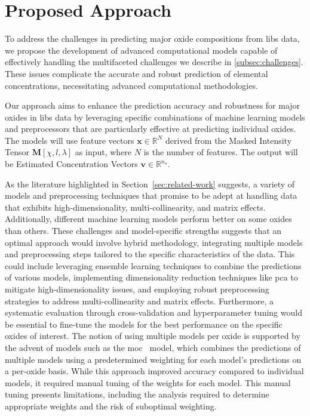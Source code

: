 \section{Proposed Approach}
To address the challenges in predicting major oxide compositions from \gls{libs} data, we propose the development of advanced computational models capable of effectively handling the multifaceted challenges we describe in \ref{subsec:challenges}.
These issues complicate the accurate and robust prediction of elemental concentrations, necessitating advanced computational methodologies. 

Our approach aims to enhance the prediction accuracy and robustness for major oxides in \gls{libs} data by leveraging specific combinations of machine learning models and preprocessors that are particularly effective at predicting individual oxides.
The models will use feature vectors $\mathbf{x} \in \mathbb{R}^N$ derived from the Masked Intensity Tensor $\mathbf{M}[\chi, l, \lambda]$ as input, where $N$ is the number of features. 
The output will be Estimated Concentration Vectors $\mathbf{v} \in \mathbb{R}^{n_o}$.

As the literature highlighted in Section~\ref{sec:related-work} suggests, a variety of models and preprocessing techniques that promise to be adept at handling data that exhibits high-dimensionality, multi-collinearity, and matrix effects.
Additionally, different machine learning models perform better on some oxides than others. 
These challenges and model-specific strengths suggests that an optimal approach would involve hybrid methodology, integrating multiple models and preprocessing steps tailored to the specific characteristics of the data.
This could include leveraging ensemble learning techniques to combine the predictions of various models, implementing dimensionality reduction techniques like \gls{pca} to mitigate high-dimensionality issues, and employing robust preprocessing strategies to address multi-collinearity and matrix effects.
Furthermore, a systematic evaluation through cross-validation and hyperparameter tuning would be essential to fine-tune the models for the best performance on the specific oxides of interest.
The notion of using multiple models per oxide is supported by the advent of models such as the \gls{moc}~\cite{cleggRecalibrationMarsScience2017} model, which combines the predictions of multiple models using a predetermined weighting for each model's predictions on a per-oxide basis.
While this approach improved accuracy compared to individual models, it required manual tuning of the weights for each model.
This manual tuning presents limitations, including the analysis required to determine appropriate weights and the risk of suboptimal weighting.

